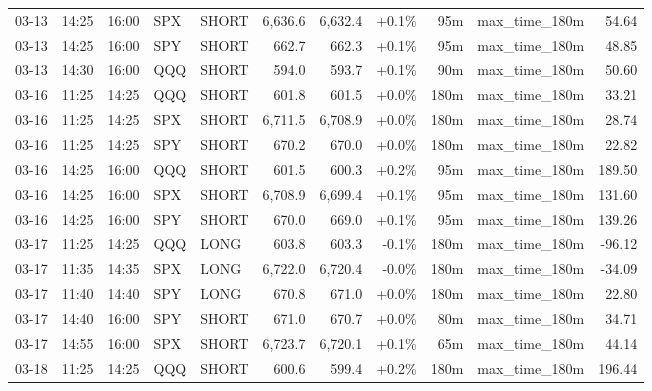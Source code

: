 \documentclass[11pt,a4paper,twoside]{article}
\begin{document}
\begin{center}
\begin{longtable}{>{\color{txtmain}}l l l l l r r r r >{\color{txtmain}}l r}
03-13 & 14:25 & 16:00 & SPX & SHORT & 6,636.6 & 6,632.4 & \textcolor{wingreen}{+0.1\%} & 95m & max\_time\_180m & \textcolor{wingreen}{54.64} \\
03-13 & 14:25 & 16:00 & SPY & SHORT & 662.7 & 662.3 & \textcolor{wingreen}{+0.1\%} & 95m & max\_time\_180m & \textcolor{wingreen}{48.85} \\
03-13 & 14:30 & 16:00 & QQQ & SHORT & 594.0 & 593.7 & \textcolor{wingreen}{+0.1\%} & 90m & max\_time\_180m & \textcolor{wingreen}{50.60} \\
03-16 & 11:25 & 14:25 & QQQ & SHORT & 601.8 & 601.5 & \textcolor{wingreen}{+0.0\%} & 180m & max\_time\_180m & \textcolor{wingreen}{33.21} \\
03-16 & 11:25 & 14:25 & SPX & SHORT & 6,711.5 & 6,708.9 & \textcolor{wingreen}{+0.0\%} & 180m & max\_time\_180m & \textcolor{wingreen}{28.74} \\
03-16 & 11:25 & 14:25 & SPY & SHORT & 670.2 & 670.0 & \textcolor{wingreen}{+0.0\%} & 180m & max\_time\_180m & \textcolor{wingreen}{22.82} \\
03-16 & 14:25 & 16:00 & QQQ & SHORT & 601.5 & 600.3 & \textcolor{wingreen}{+0.2\%} & 95m & max\_time\_180m & \textcolor{wingreen}{189.50} \\
03-16 & 14:25 & 16:00 & SPX & SHORT & 6,708.9 & 6,699.4 & \textcolor{wingreen}{+0.1\%} & 95m & max\_time\_180m & \textcolor{wingreen}{131.60} \\
03-16 & 14:25 & 16:00 & SPY & SHORT & 670.0 & 669.0 & \textcolor{wingreen}{+0.1\%} & 95m & max\_time\_180m & \textcolor{wingreen}{139.26} \\
03-17 & 11:25 & 14:25 & QQQ & LONG & 603.8 & 603.3 & \textcolor{lossred}{-0.1\%} & 180m & max\_time\_180m & \textcolor{lossred}{-96.12} \\
03-17 & 11:35 & 14:35 & SPX & LONG & 6,722.0 & 6,720.4 & \textcolor{lossred}{-0.0\%} & 180m & max\_time\_180m & \textcolor{lossred}{-34.09} \\
03-17 & 11:40 & 14:40 & SPY & LONG & 670.8 & 671.0 & \textcolor{wingreen}{+0.0\%} & 180m & max\_time\_180m & \textcolor{wingreen}{22.80} \\
03-17 & 14:40 & 16:00 & SPY & SHORT & 671.0 & 670.7 & \textcolor{wingreen}{+0.0\%} & 80m & max\_time\_180m & \textcolor{wingreen}{34.71} \\
03-17 & 14:55 & 16:00 & SPX & SHORT & 6,723.7 & 6,720.1 & \textcolor{wingreen}{+0.1\%} & 65m & max\_time\_180m & \textcolor{wingreen}{44.14} \\
03-18 & 11:25 & 14:25 & QQQ & SHORT & 600.6 & 599.4 & \textcolor{wingreen}{+0.2\%} & 180m & max\_time\_180m & \textcolor{wingreen}{196.44} \\

\end{longtable}
\end{center}
\end{document}
